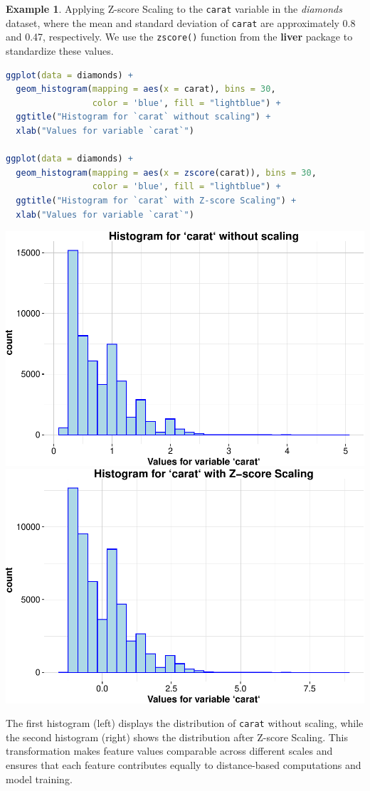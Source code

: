 \documentclass[
]{book}
\newcommand{\passthrough}[1]{#1}
\theoremstyle{definition}
\theoremstyle{definition}
\newtheorem{example}{Example}[chapter]
\theoremstyle{definition}
\theoremstyle{definition}
\theoremstyle{remark}
\begin{document}
\begin{example}
\protect\hypertarget{exm:ex-zscore}{}\label{exm:ex-zscore}Applying Z-score Scaling to the \passthrough{\lstinline!carat!} variable in the \emph{diamonds} dataset, where the mean and standard deviation of \passthrough{\lstinline!carat!} are approximately 0.8 and 0.47, respectively. We use the \passthrough{\lstinline!zscore()!} function from the \textbf{liver} package to standardize these values.

\begin{lstlisting}[language=R]
ggplot(data = diamonds) +
  geom_histogram(mapping = aes(x = carat), bins = 30,
                 color = 'blue', fill = "lightblue") +
  ggtitle("Histogram for `carat` without scaling") + 
  xlab("Values for variable `carat`")

ggplot(data = diamonds) +
  geom_histogram(mapping = aes(x = zscore(carat)), bins = 30,
                 color = 'blue', fill = "lightblue") +
  ggtitle("Histogram for `carat` with Z-score Scaling") + 
  xlab("Values for variable `carat`")
\end{lstlisting}

\includegraphics[width=0.5\linewidth]{data-preparation_files/figure-latex/unnamed-chunk-11-1} \includegraphics[width=0.5\linewidth]{data-preparation_files/figure-latex/unnamed-chunk-11-2}

The first histogram (left) displays the distribution of \passthrough{\lstinline!carat!} without scaling, while the second histogram (right) shows the distribution after Z-score Scaling. This transformation makes feature values comparable across different scales and ensures that each feature contributes equally to distance-based computations and model training.
\end{example}
\end{document}

